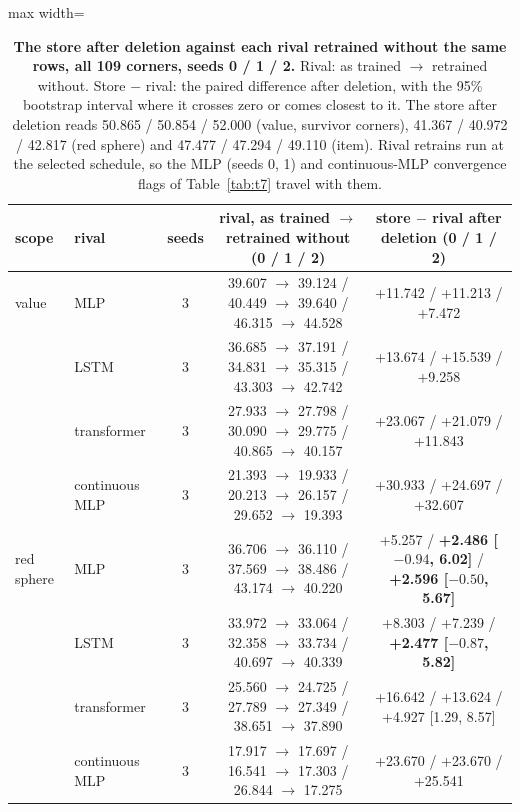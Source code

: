 \documentclass{article} %
\begin{document}
\begin{table}[h]
\centering\scriptsize
\caption{\textbf{The store after deletion against each rival retrained without the same rows, all %
109 corners, seeds 0 / 1 / 2.} Rival: as trained $\to$ retrained without. Store $-$ rival: the %
paired difference after deletion, with the 95\% bootstrap interval where it crosses zero or comes
closest to it. The store after deletion reads 50.865 / 50.854 / 52.000 (value, survivor corners), %
41.367 / 40.972 / 42.817 (red sphere) and 47.477 / 47.294 / 49.110 (item). Rival retrains run at the %
selected schedule, so the MLP (seeds 0, 1) and continuous-MLP convergence flags of Table~\ref{tab:t7} travel with them.}
\label{tab:rivals-del-seeds}
\setlength{\tabcolsep}{2.4pt}
\begin{adjustbox}{max width=\linewidth}\begin{tabular}{llccc}
\toprule
scope & rival & seeds & rival, as trained $\to$ retrained without (0 / 1 / 2) & store $-$ rival after deletion (0 / 1 / 2) \\
\midrule
value & MLP & 3 & 39.607 $\to$ 39.124 / 40.449 $\to$ 39.640 / 46.315 $\to$ 44.528 & +11.742 / +11.213 / +7.472 \\
 & LSTM & 3 & 36.685 $\to$ 37.191 / 34.831 $\to$ 35.315 / 43.303 $\to$ 42.742 & +13.674 / +15.539 / +9.258 \\
 & transformer & 3 & 27.933 $\to$ 27.798 / 30.090 $\to$ 29.775 / 40.865 $\to$ 40.157 & +23.067 / +21.079 / +11.843 \\
 & continuous MLP & 3 & 21.393 $\to$ 19.933 / 20.213 $\to$ 26.157 / 29.652 $\to$ 19.393 & +30.933 / +24.697 / +32.607 \\
red sphere & MLP & 3 & 36.706 $\to$ 36.110 / 37.569 $\to$ 38.486 / 43.174 $\to$ 40.220 & +5.257 / \textbf{+2.486 [$-0.94$, 6.02]} / \textbf{+2.596 [$-0.50$, 5.67]} \\
 & LSTM & 3 & 33.972 $\to$ 33.064 / 32.358 $\to$ 33.734 / 40.697 $\to$ 40.339 & +8.303 / +7.239 / \textbf{+2.477 [$-0.87$, 5.82]} \\
 & transformer & 3 & 25.560 $\to$ 24.725 / 27.789 $\to$ 27.349 / 38.651 $\to$ 37.890 & +16.642 / +13.624 / +4.927 [1.29, 8.57] \\
 & continuous MLP & 3 & 17.917 $\to$ 17.697 / 16.541 $\to$ 17.303 / 26.844 $\to$ 17.275 & +23.670 / +23.670 / +25.541 \\

\end{tabular}
\end{adjustbox}
\end{table}
\end{document}
